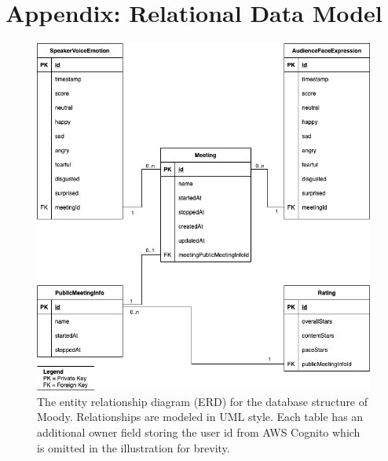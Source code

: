 \newpage
\section*{Appendix: Relational Data Model}
\label{app:appendix_relational_data_model}
\begin{figure}[ht]
\label{fig:erd}
\centering
\includegraphics[width=1\textwidth]{assets/erd.png}
\caption{The entity relationship diagram (ERD) for the database structure of Moody. Relationships are modeled in UML style. Each table has an additional owner field  storing the user id from AWS Cognito which is omitted in the illustration for brevity.}
\end{figure}
